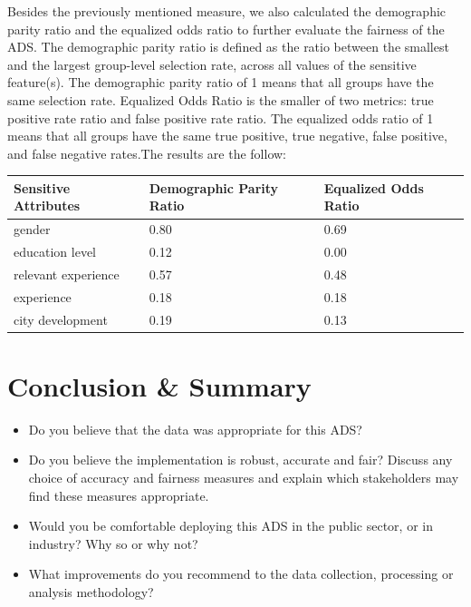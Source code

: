 Besides the previously mentioned measure, we also calculated the demographic parity ratio and the equalized odds ratio to further evaluate the fairness of the ADS. The demographic parity ratio is defined as the ratio between the smallest and the largest group-level selection rate, across all values of the sensitive feature(s). The demographic parity ratio of 1 means that all groups have the same selection rate. Equalized Odds Ratio is the smaller of two metrics: true positive rate ratio and false positive rate ratio. The equalized odds ratio of 1 means that all groups have the same true positive, true negative, false positive, and false negative rates.The results are the follow:
\begin{table}[h]
\centering
\begin{tabular}{ |p{4cm}||p{3cm}||p{3cm}|}
 \hline
Sensitive Attributes 		& Demographic Parity Ratio & Equalized Odds Ratio\\
 \hline

gender 	& 0.80 & 0.69 \\

education level 	& 0.12 & 0.00\\

relevant experience 	& 0.57 & 0.48\\

experience & 0.18 & 0.18\\

city development		 & 0.19 & 0.13\\

 \hline
\end{tabular}
\end{table}

\pagebreak

\section{Conclusion \& Summary}
\begin{itemize}
\item Do you believe that the data was appropriate for this ADS?  
\item Do you believe the implementation is robust, accurate and fair?  Discuss any choice of accuracy and fairness measures and explain which stakeholders may find these measures appropriate.
\item Would you be comfortable deploying this ADS in the public sector, or in industry?  Why so or why not?
\item What improvements do you recommend to the data collection, processing or analysis methodology?
\end{itemize}


